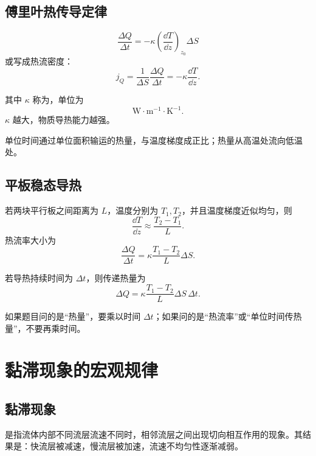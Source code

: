 \subsection{傅里叶热传导定律}

\begin{FormulaBox}[傅里叶定律]
\[
  \boxed{
  \frac{\Delta Q}{\Delta t}
  =
  -\kappa
  \left(\frac{\dd T}{\dd z}\right)_{z_0}
  \Delta S
  }
\]
或写成热流密度：
\[
  \boxed{
  j_Q
  =
  \frac{1}{\Delta S}\frac{\Delta Q}{\Delta t}
  =
  -\kappa\frac{\dd T}{\dd z}
  }.
\]
\end{FormulaBox}

其中 \(\kappa\) 称为，单位为
\[
  \mathrm{W\cdot m^{-1}\cdot K^{-1}}.
\]
\(\kappa\) 越大，物质导热能力越强。

\begin{KeyBox}[傅里叶定律的物理含义]
单位时间通过单位面积输运的热量，与温度梯度成正比；热量从高温处流向低温处。
\end{KeyBox}

\subsection{平板稳态导热}

若两块平行板之间距离为 \(L\)，温度分别为 \(T_1,T_2\)，并且温度梯度近似均匀，则
\[
  \frac{\dd T}{\dd z}\approx \frac{T_2-T_1}{L}.
\]
热流率大小为
\[
  \boxed{
  \frac{\Delta Q}{\Delta t}
  =
  \kappa\frac{T_1-T_2}{L}\Delta S
  }.
\]

若导热持续时间为 \(\Delta t\)，则传递热量为
\[
  \boxed{
  \Delta Q
  =
  \kappa\frac{T_1-T_2}{L}\Delta S\,\Delta t
  }.
\]

\begin{WarnBox}[热传导题常见错误]
如果题目问的是“热量”，要乘以时间 \(\Delta t\)；如果问的是“热流率”或“单位时间传热量”，不要再乘时间。
\end{WarnBox}

\section{黏滞现象的宏观规律}

\subsection{黏滞现象}

是指流体内部不同流层流速不同时，相邻流层之间出现切向相互作用的现象。其结果是：快流层被减速，慢流层被加速，流速不均匀性逐渐减弱。

